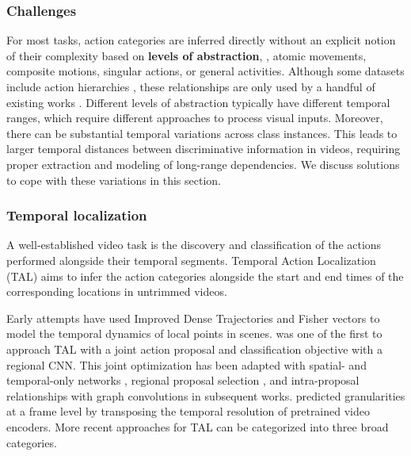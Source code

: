 \subsubsection{Challenges}
\label{sec:recognition::temporal:::challenges}

For most tasks, action categories are inferred directly without an explicit notion of their complexity based on \textbf{levels of abstraction}, \eg, atomic movements, composite motions, singular actions, or general activities. Although some datasets include action hierarchies , these relationships are only used by a handful of existing works . Different levels of abstraction typically have different temporal ranges, which require different approaches to process visual inputs. Moreover, there can be substantial temporal variations across class instances. This leads to larger temporal distances between discriminative information in videos, requiring proper extraction and modeling of long-range dependencies. We discuss solutions to cope with these variations in this section.

\subsubsection{Temporal localization} 
\label{sec:recognition::temporal:::localization}

A well-established video task is the discovery and classification of the actions performed alongside their temporal segments. Temporal Action Localization (TAL) aims to infer the action categories alongside the start and end times of the corresponding locations in untrimmed videos. 


Early attempts have used Improved Dense Trajectories  and Fisher vectors  to model the temporal dynamics of local points in scenes.  was one of the first to approach TAL with a joint action proposal and classification objective with a regional CNN. This joint optimization has been adapted with spatial- and temporal-only networks , regional proposal selection , and intra-proposal relationships with graph convolutions  in subsequent works.  predicted granularities at a frame level by transposing the temporal resolution of pretrained video encoders. More recent approaches for TAL can be categorized into three broad categories. 

